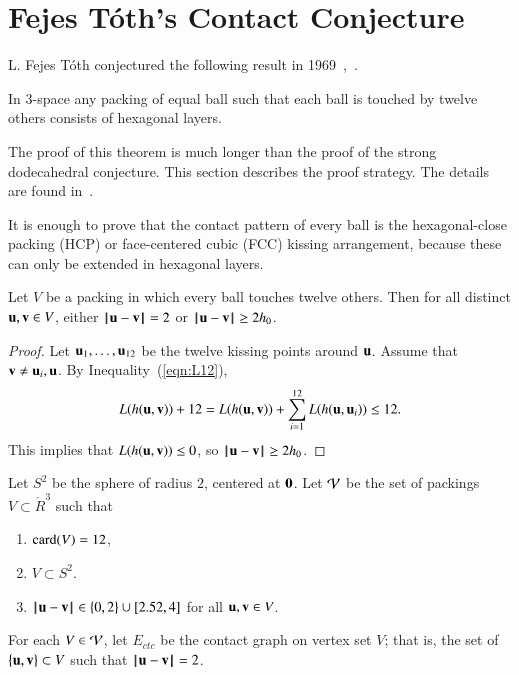 \documentclass{llncs}
\begin{document}
\section{Fejes T\'oth's Contact Conjecture}


L. Fejes T\'oth conjectured the following result in
1969~\cite{Fejes-Toth:69},~\cite{Fejes-Toth:89}. 

\begin{theorem}
  In $3$-space any packing of equal ball such that each ball is touched
  by twelve others consists of hexagonal layers.
\end{theorem}

The proof of this theorem is much longer than the proof of the strong
dodecahedral conjecture.  This section describes the proof strategy.
The details are found in~\cite{DSP}.

It is enough to prove that the contact pattern of every ball is the hexagonal-close
packing (HCP) or face-centered cubic (FCC) kissing arrangement, because these can only be
extended in hexagonal layers.

\begin{lemma} Let $V$ be a packing in which every ball touches twelve others.
Then for all distinct ${\mathbf u},{\mathbf v}\in V$, either $\norm{\u}{\v}=2$ or $\norm{\u}{\v}\ge 2h_0$.
\end{lemma}

\begin{proof}
Let $ {\mathbf u}_1,\ldots, {\mathbf u}_{12}$ be the twelve kissing points
  around ${\mathbf u}$.  Assume that ${\mathbf v}\ne {\mathbf u}_i,{\mathbf u}$.  By
  Inequality~(\ref{eqn:L12}),
\[
   L(h( {\mathbf u}, {\mathbf v}))  + 12 
  =  L(h( {\mathbf u}, {\mathbf v})) + \sum_{i=1}^{12} L(h( {\mathbf u}, {\mathbf u}_i))  \le 12.
\]
This implies that $L(h( {\mathbf u}, {\mathbf v}))\le 0$, so $\norm{ \u}{ \v}\ge 2h_0$.
\end{proof}

\begin{definition}
  Let $S^2$ be the sphere of radius $2$, centered at ${\mathbf 0}$.  Let
  ${\mathcal V}$ be the set of packings $V\subset \ring{R}^3$ such that
\begin{enumerate}
\item ${\operatorname{card}}(V) = 12$,
\item $V\subset S^2$.
\item $\norm{\u}{\v} \in \{0,2\}\cup
  \leftclosed2.52,4\rightclosed$ for all ${\mathbf u},{\mathbf v}\in V$.
\end{enumerate}
For each $V\in {\mathcal V}$, let $E_{ctc}$ be the contact graph on vertex set $V$;
that is, the set of $\{{\mathbf u},{\mathbf v}\}\subset V$ such that $\norm{\u}{\v}=2$.
\end{definition}
\end{document}
